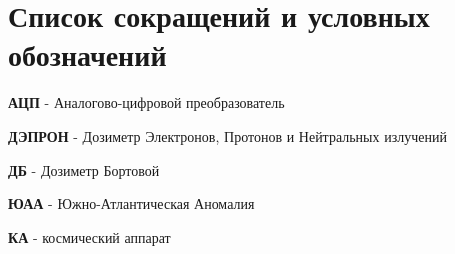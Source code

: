 \chapter*{Список сокращений и условных обозначений}             %

\textbf{АЦП} - Аналогово-цифровой преобразователь

\textbf{ДЭПРОН} - Дозиметр Электронов, Протонов и Нейтральных излучений

\textbf{ДБ} - Дозиметр Бортовой

\textbf{ЮАА} - Южно-Атлантическая Аномалия

\textbf{КА} - космический аппарат